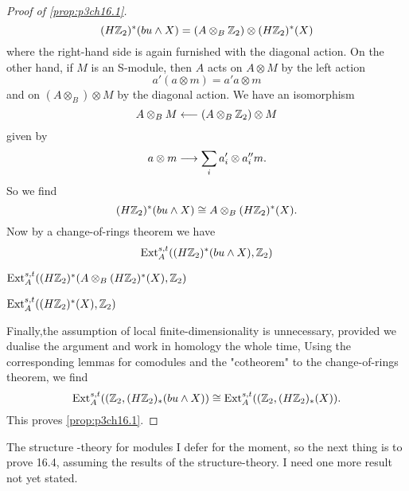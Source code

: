 \documentclass[../main]{subfiles}
\begin{document}
\begin{proof}[Proof of \ref{prop:p3ch16.1}]
\begin{equation*}
    (H\mathbb{Z}_2)^{\ast}(bu \wedge X)= (A \otimes_{B} \mathbb{Z}_2)\otimes(H\mathbb{Z}_2)^{\ast}(X) 
\end{equation*}
where the right-hand side is again furnished with the diagonal action. On
the other hand, if $M$ is an S-module, then $A$ acts on $A \otimes M$ by the left action \begin{equation*}
 a'(a\otimes m )= a'a \otimes m 
\end{equation*}
and on $(A \otimes_{B})\otimes M$ by the diagonal action. We have an isomorphism \begin{equation*}
    A \otimes_{B} M \overset{}{\longleftarrow} (A \otimes_{B} \mathbb{Z}_2)\otimes M
\end{equation*}
given by \begin{equation*}
    a \otimes m \overset{}{\longrightarrow} \sum_{i}a_{i}'\otimes a_{i}''m.
\end{equation*}
So we find \begin{equation*}
    (H\mathbb{Z}_2)^{\ast}(bu \wedge X) \cong A \otimes_{B}(H\mathbb{Z}_2)^{\ast}(X).
\end{equation*}
Now by a change-of-rings theorem we have \begin{equation*}
    \mathrm{Ext}_{A}^{s,t}((H\mathbb{Z}_2)^{\ast}(bu \wedge X),\mathbb{Z}_2)
\end{equation*}
\begin{center}
    $\mathrm{Ext}_{A}^{s,t}((H\mathbb{Z}_2)^{\ast}(A \otimes_{B}(H\mathbb{Z}_2)^{\ast}(X),\mathbb{Z}_2)$ 
\end{center}
\begin{center}
    $\mathrm{Ext}_{A}^{s,t}((H\mathbb{Z}_2)^{\ast}(X),\mathbb{Z}_2)$
\end{center}
Finally,the assumption of local finite-dimensionality is unnecessary,
provided we dualise the argument and work in homology the whole time,
Using the corresponding lemmas for comodules and the "cotheorem" to
the change-of-rings theorem, we find \begin{equation*}
    \mathrm{Ext}_{A}^{s,t}((\mathbb{Z}_2,(H\mathbb{Z}_2)_{\ast}(bu \wedge X)) \cong \mathrm{Ext}_{A}^{s,t}((\mathbb{Z}_2,(H\mathbb{Z}_2)_{\ast}(X)).
\end{equation*}
This proves \ref{prop:p3ch16.1}.
     \end{proof}
     
    The structure -theory for modules I defer for the moment, so the
next thing is to prove 16.4, assuming the results of the structure-theory.
I need one more result not yet stated. 
\end{document}
